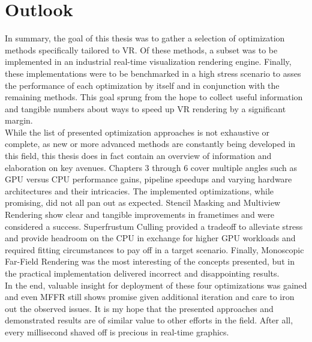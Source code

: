 
\chapter{Outlook}
In summary, the goal of this thesis was to gather a selection of optimization methods specifically tailored to \gls{VR}. Of these methods, a subset was to be implemented in an industrial real-time visualization rendering engine. Finally, these implementations were to be benchmarked in a high stress scenario to asses the performance of each optimization by itself and in conjunction with the remaining methods. This goal sprung from the hope to collect useful information and tangible numbers about ways to speed up \gls{VR} rendering by a significant margin. \\
While the list of presented optimization approaches is not exhaustive or complete, as new or more advanced methods are constantly being developed in this field, this thesis does in fact contain an overview of information and elaboration on key avenues. Chapters 3 through 6 cover multiple angles such as GPU versus CPU performance gains, pipeline speedups and varying hardware architectures and their intricacies. 
The implemented optimizations, while promising, did not all pan out as expected. Stencil Masking and Multiview Rendering show clear and tangible improvements in frametimes and were considered a success. Superfrustum Culling provided a tradeoff to alleviate stress and provide headroom on the CPU in exchange for higher GPU workloads and required fitting circumstances to pay off in a target scenario. Finally, Monoscopic Far-Field Rendering was the most interesting of the concepts presented, but in the practical implementation delivered incorrect and disappointing results. \\
In the end, valuable insight for deployment of these four optimizations was gained and even \gls{MFFR} still shows promise given additional iteration and care to iron out the observed issues. It is my hope that the presented approaches and demonstrated results are of similar value to other efforts in the field. After all, every millisecond shaved off is precious in real-time graphics. 